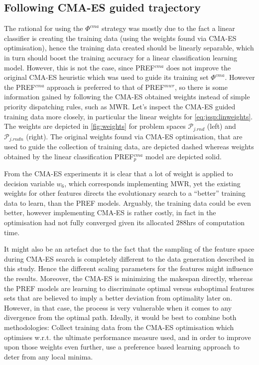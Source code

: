 \documentclass[smallextended]{llncs}
\newcommand{\PREF}[2]{PREF$_{#2}^{#1}$}
\begin{document}
\subsection{Following CMA-ES guided trajectory}\label{sec:expr:cmaes}
The rational for using the $\Phi^{cma}$ strategy was mostly due to the fact a linear classifier is creating the training data (using the weights found via CMA-ES optimisation), hence the training data created should be linearly separable, which in turn should boost the training accuracy for a linear classification learning model. However, this is not the case, since \PREF{cma}{} does not improve the original CMA-ES heuristic which 
was used to guide its training set $\Phi^{cma}$. However the \PREF{cma}{} approach is preferred to that of \PREF{mwr}{}, so there is some information gained by following the CMA-ES obtained weights instead of simple priority dispatching rules, such as MWR. 
%
Let's inspect the CMA-ES guided training data more closely, in particular the linear weights for \cref{eq:jssp:linweights}. The weights are depicted in \cref{fig:weights} for problem spaces $\mathcal{P}_{j.rnd}$ (left) and $\mathcal{P}_{j.rndn}$ (right). The original weights found via CMA-ES optimisation, that are used to guide the collection of training data, are depicted dashed whereas weights obtained by the linear classification \PREF{cma}{p} model are depicted solid. 

From the CMA-ES experiments it is clear that a lot of weight is applied to decision variable $w_6$, which corresponds implementing MWR, yet the existing weights for other features directs the evolutionary search to a ``better'' training data to learn, than the PREF models. Arguably, the training data could be even better, however implementing CMA-ES is rather costly, in fact in \cite{InRu14a} the optimisation had not fully converged given its allocated 288hrs of computation time.

It might also be an artefact due to the fact that the sampling of the feature space during CMA-ES search is completely different to the data generation described in this study. Hence the different scaling parameters for the features might influence the results. Moreover, the CMA-ES is minimizing the makespan directly, whereas the PREF models are learning to discriminate optimal versus suboptimal features sets that  are believed to imply a better deviation from optimality later on. However, in that case, the process is very vulnerable when it comes to any divergence from the optimal path. 
Ideally,  it would be best to combine both methodologies: Collect training data from the CMA-ES optimisation which optimises w.r.t. the ultimate performance measure used, and in order to improve upon those weights even further, use a preference based learning approach to deter from any local minima. 
\end{document}
